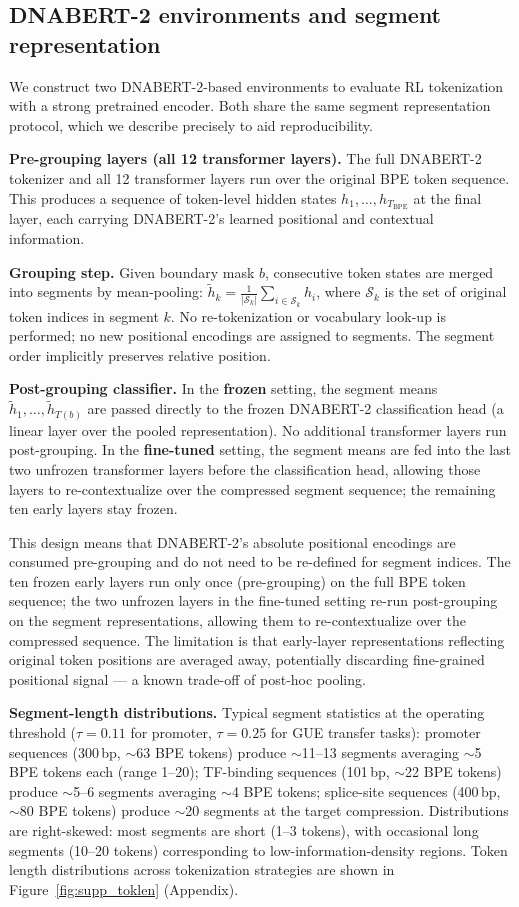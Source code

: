 \documentclass[sigconf,screen]{acmart}
\newcommand{\dnabert}{DNABERT-2\xspace}
\begin{document}
\subsection{\dnabert environments and segment representation}
We construct two \dnabert-based environments to evaluate RL tokenization with a strong pretrained encoder. Both share the same segment representation protocol, which we describe precisely to aid reproducibility.

\textbf{Pre-grouping layers (all 12 transformer layers).} The full \dnabert tokenizer and all 12 transformer layers run over the original BPE token sequence. This produces a sequence of token-level hidden states $h_1,\ldots,h_{T_{\mathrm{BPE}}}$ at the final layer, each carrying \dnabert's learned positional and contextual information.

\textbf{Grouping step.} Given boundary mask $b$, consecutive token states are merged into segments by mean-pooling: $\tilde{h}_k = \frac{1}{|\mathcal{S}_k|}\sum_{i \in \mathcal{S}_k} h_i$, where $\mathcal{S}_k$ is the set of original token indices in segment $k$. No re-tokenization or vocabulary look-up is performed; no new positional encodings are assigned to segments. The segment order implicitly preserves relative position.

\textbf{Post-grouping classifier.} In the \textbf{frozen} setting, the segment means $\tilde{h}_1,\ldots,\tilde{h}_{T(b)}$ are passed directly to the frozen \dnabert classification head (a linear layer over the pooled representation). No additional transformer layers run post-grouping. In the \textbf{fine-tuned} setting, the segment means are fed into the last two unfrozen transformer layers before the classification head, allowing those layers to re-contextualize over the compressed segment sequence; the remaining ten early layers stay frozen.

This design means that \dnabert's absolute positional encodings are consumed pre-grouping and do not need to be re-defined for segment indices. The ten frozen early layers run only once (pre-grouping) on the full BPE token sequence; the two unfrozen layers in the fine-tuned setting re-run post-grouping on the segment representations, allowing them to re-contextualize over the compressed sequence. The limitation is that early-layer representations reflecting original token positions are averaged away, potentially discarding fine-grained positional signal — a known trade-off of post-hoc pooling.

\textbf{Segment-length distributions.} Typical segment statistics at the operating threshold ($\tau=0.11$ for promoter, $\tau=0.25$ for GUE transfer tasks): promoter sequences (300\,bp, $\sim$63 BPE tokens) produce $\sim$11--13 segments averaging $\sim$5 BPE tokens each (range 1--20); TF-binding sequences (101\,bp, $\sim$22 BPE tokens) produce $\sim$5--6 segments averaging $\sim$4 BPE tokens; splice-site sequences (400\,bp, $\sim$80 BPE tokens) produce $\sim$20 segments at the target compression. Distributions are right-skewed: most segments are short (1--3 tokens), with occasional long segments (10--20 tokens) corresponding to low-information-density regions. Token length distributions across tokenization strategies are shown in Figure~\ref{fig:supp_toklen} (Appendix).
\end{document}
